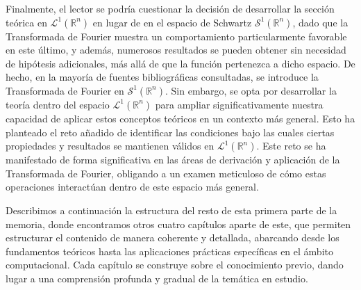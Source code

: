 \noindent 
Finalmente, el lector se podría cuestionar la decisión de desarrollar la sección teórica en $\mathscr{L}^1(\mathbb{R}^n)$ en lugar de en el espacio de Schwartz $\mathscr{S}^1(\mathbb{R}^n)$, dado que la Transformada de Fourier muestra un comportamiento particularmente favorable en este último, y además, numerosos resultados se pueden obtener sin necesidad de hipótesis adicionales, más allá de que la función pertenezca a dicho espacio. De hecho, en la mayoría de fuentes bibliográficas consultadas, se introduce la Transformada de Fourier en $\mathscr{S}^1(\mathbb{R}^n)$. Sin embargo, se opta  por desarrollar la teoría dentro del espacio $\mathscr{L}^1(\mathbb{R}^n)$ para ampliar significativamente nuestra capacidad de aplicar estos conceptos teóricos en un contexto más general. Esto ha planteado el reto añadido de identificar las condiciones bajo las cuales ciertas propiedades y resultados se mantienen válidos en $\mathscr{L}^1(\mathbb{R}^n)$. Este reto se ha manifestado de forma significativa en las áreas de derivación y aplicación de la Transformada de Fourier, obligando a un examen meticuloso de cómo estas operaciones interactúan dentro de este espacio más general.



\vspace{0.2cm}

\noindent Describimos a continuación la estructura del resto de esta primera parte de la memoria, donde encontramos otros cuatro capítulos aparte de este, que permiten estructurar el contenido  de manera coherente y detallada, abarcando desde los fundamentos teóricos hasta las aplicaciones prácticas específicas en el ámbito computacional. Cada capítulo se construye sobre el conocimiento previo, dando lugar a una comprensión profunda y gradual de la temática en estudio.
\vspace{0.2cm}

